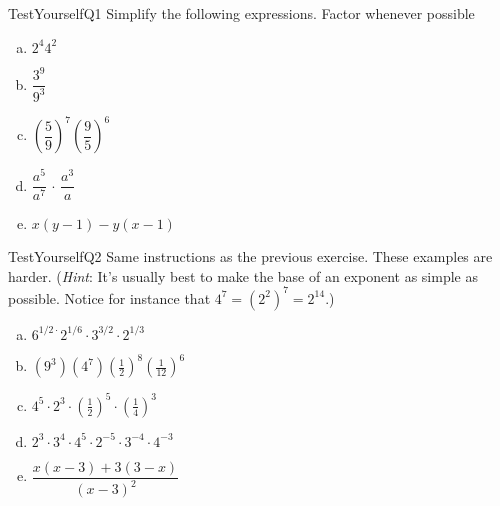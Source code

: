 \begin{exercise}{TestYourselfQ1}
Simplify the following expressions. Factor whenever possible
\begin{multicols}{2}
\begin{enumerate}[(a)]
\item
$ 2^4 4^2$
\item
$ \dfrac{3^9}{9^3}$
\item
$\left( \dfrac{5}{9} \right)^7 \left( \dfrac{9}{5} \right)^6$
\item
$\dfrac{a^5}{a^7} \, \cdot \, \dfrac{a^3}{a}$
\item
$x(y-1) - y(x-1)$
\end{enumerate}
\end{multicols}
\end{exercise}



\begin{exercise}{TestYourselfQ2}
Same instructions as the previous exercise. These examples are  harder. (\emph{Hint}: It's usually best to make the base of an exponent as simple as possible. Notice for instance that $4^7 = (2^2)^7 = 2^{14}$.)
\begin{multicols}{2}
\begin{enumerate}[(a)]
\item
$6^{1/2\cdot}2^{1/6}\cdot3^{3/2}\cdot2^{1/3}$
\item
$(9^3)(4^7)\left(\frac{1}{2}\right)^8\left(\frac{1}{12}\right)^6$
\item
$4^5 \cdot 2^3 \cdot \left(\frac{1}{2}\right)^5 \cdot \left( \frac{1}{4} \right) ^3$
\item
$2^3 \cdot 3^4 \cdot 4^5 \cdot 2^{-5} \cdot 3^{-4} \cdot 4^{-3}$
\item
$\dfrac{x(x-3)+3(3-x)}{(x-3)^2}$
\end{enumerate}
\end{multicols}
\end{exercise}


